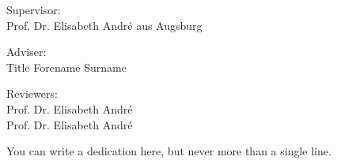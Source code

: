 \documentclass[12pt, a4paper, fleqn]{memoir}%
\begin{document}
\vspace{2.0em}
\begin{center}
    \normalsize
    Supervisor:\\ 
    Prof. Dr. Elisabeth Andr\'{e} aus Augsburg
\end{center}
\begin{center}
    \normalsize
    Adviser:\\
    Title Forename Surname
\end{center}
\begin{center}
    \normalsize
    Reviewers:\\
    Prof. Dr. Elisabeth Andr\'{e}\\
    Prof. Dr. Elisabeth Andr\'{e}\\
\end{center}
\cleardoublepage

\vspace*{\fill}
{\hfill\sffamily\itshape} You can write a dedication here, but never more than a single line. 
\cleardoublepage

\end{document}
